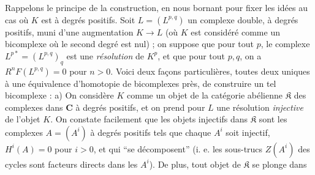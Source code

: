 Rappelons le principe de la construction, en nous bornant pour fixer les idées
au cas où $K$ est à degrés positifs. Soit $L=(L^{p,q})$ un complexe double, à
degrés positifs, muni d'une augmentation $K\to L$ (où $K$ est
considéré comme un bicomplexe où le second degré est nul) ; on suppose que pour
tout $p$, le complexe $L^{p*}=(L^{p,q})_q$ est une \textit{résolution} de
$K^p$, et que pour tout $p,q$, on a $R^nF(L^{p,q})=0$ pour $n>0$. Voici deux
façons particulières, toutes deux uniques à une équivalence d'homotopie de
bicomplexes près, de construire un tel bicomplexe : a) On considère $K$ comme
un objet de la catégorie abélienne $\mathfrak K$ des complexes dans $\mathbf{C}$ à
degrés positifs, et on prend pour $L$ une résolution \textit{injective} de
l'objet $K$. On constate facilement que les objets injectifs dans $\mathfrak K$
sont les complexes $A=(A^i)$ à degrés positifs tels que chaque $A^i$ soit
injectif, $H^i(A)=0$ pour $i>0$, et qui ``se décomposent'' (i. e. les
sous-trucs $Z(A^i)$ des cycles sont facteurs directs dans les $A^i$). De plus,
tout objet de $\mathfrak K$ se plonge dans


